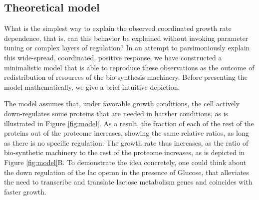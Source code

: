 \documentclass[notitlepage]{article}
\begin{document}
\subsection{Theoretical model}
What is the simplest way to explain the observed coordinated growth rate dependence, that is, can this behavior be explained without invoking parameter tuning or complex layers of regulation?
In an attempt to parsimoniously explain this wide-spread, coordinated, positive response, we have constructed a minimalistic model that is able to reproduce these observations as the outcome of redistribution of resources of the bio-synthesis machinery.
Before presenting the model mathematically, we give a brief intuitive depiction.

The model assumes that, under favorable growth conditions, the cell actively down-regulates some proteins that are needed in harsher conditions, as is illustrated in Figure \ref{fig:model}.
As a result, the fraction of each of the rest of the proteins out of the proteome increases, showing the same relative ratios, as long as there is no specific regulation.
The growth rate thus increases, as the ratio of bio-synthetic machinery to the rest of the proteome increases, as is depicted in Figure \ref{fig:model}B.
To demonstrate the idea concretely, one could think about the down regulation of the lac operon in the presence of Glucose, that alleviates the need to transcribe and translate lactose metabolism genes and coincides with faster growth.
\end{document}
